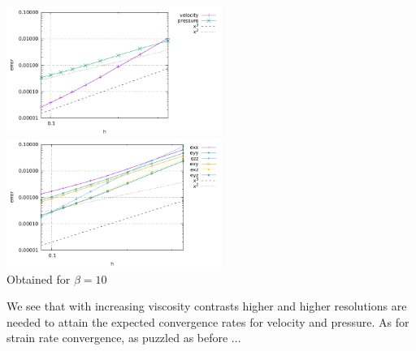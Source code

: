 \begin{center}
\includegraphics[width=7cm]{python_codes/fieldstone_17/results_beta10/errors.pdf}
\includegraphics[width=7cm]{python_codes/fieldstone_17/results_beta10/errors_sr.pdf}\\
{\captionfont Obtained for $\beta=10$}
\end{center}

We see that with increasing viscosity contrasts higher and higher resolutions are needed to 
attain the expected convergence rates for velocity and pressure. As for strain rate convergence, 
as puzzled as before ...



